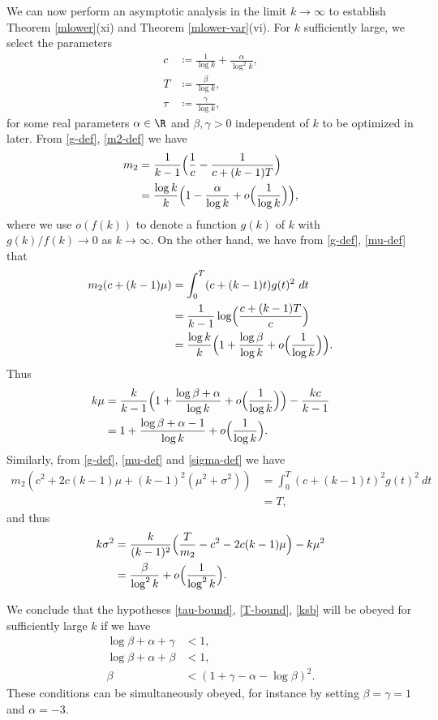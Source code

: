 We can now perform an asymptotic analysis in the limit $k \to \infty$ to establish Theorem \ref{mlower}(xi) and Theorem \ref{mlower-var}(vi).  For $k$ sufficiently large, we select the parameters
\begin{align*}
c &\coloneqq \frac{1}{\log k} + \frac{\alpha}{\log^2 k}, \\
T &\coloneqq \frac{\beta}{\log k}, \\
\tau &\coloneqq \frac{\gamma}{\log k},
\end{align*}
for some real parameters $\alpha \in \R$ and $\beta,\gamma > 0$ independent of $k$ to be optimized in later.  From \eqref{g-def}, \eqref{m2-def} we have
\begin{align*}
m_2 &= \frac{1}{k-1} \Bigl( \frac{1}{c} - \frac{1}{c+(k-1)T} \Bigr) \\
&= \frac{\log k}{k} \Bigl(1 - \frac{\alpha}{\log k} + o\Bigl( \frac{1}{\log k} \Bigr) \Bigr),
\end{align*}
where we use $o(f(k))$ to denote a function $g(k)$ of $k$ with $g(k)/f(k) \to 0$ as $k \to \infty$.  On the other hand, we have from \eqref{g-def}, \eqref{mu-def} that
\begin{align*}
m_2 (c + (k-1) \mu) &= \int_0^T (c+(k-1)t) g(t)^2\ dt \\
&= \frac{1}{k-1} \log \Bigl(\frac{c+(k-1)T}{c}\Bigr) \\
&= \frac{\log k}{k} \Bigl(1 + \frac{\log \beta}{\log k} + o\Bigl( \frac{1}{\log k} \Bigr) \Bigr).
\end{align*}
Thus
\begin{align*}
 k\mu &= \frac{k}{k-1} \Bigl(1 + \frac{\log \beta + \alpha}{\log k} + o\Bigl(\frac{1}{\log k} \Bigr) \Bigr) - \frac{kc}{k-1} \\
&= 1 + \frac{\log \beta + \alpha - 1}{\log k} + o\Bigl( \frac{1}{\log k} \Bigr).
\end{align*}
Similarly, from \eqref{g-def}, \eqref{mu-def} and \eqref{sigma-def} we have
\begin{align*}
m_2 (c^2 + 2c(k-1)\mu + (k-1)^2 (\mu^2+\sigma^2)) &= \int_0^T (c+(k-1)t)^2 g(t)^2\ dt \\
&= T,
\end{align*}
and thus
\begin{align*}
k \sigma^2 &= \frac{k}{(k-1)^2} \Bigl(\frac{T}{m_2} - c^2 - 2c(k-1)\mu\Bigr) - k \mu^2 \\
&= \frac{\beta}{\log^2 k} + o\Bigl( \frac{1}{\log^2 k} \Bigr).
\end{align*}

We conclude that the hypotheses \eqref{tau-bound}, \eqref{T-bound}, \eqref{ksb} will be obeyed for sufficiently large $k$ if we have
\begin{align*}
\log \beta + \alpha + \gamma &< 1, \\
\log \beta + \alpha + \beta &< 1, \\
\beta &< (1 + \gamma - \alpha - \log \beta )^2.
\end{align*}
These conditions can be simultaneously obeyed, for instance by setting $\beta=\gamma=1$ and $\alpha = -3$.

